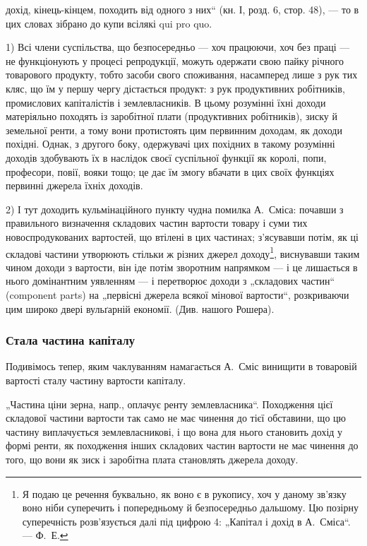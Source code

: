 \parcont{}  %
дохід, кінець-кінцем, походить від одного з них“ (кн. І, розд. 6,
стор. 48), — то в цих словах зібрано до купи всілякі qui pro quo.

1) Всі члени суспільства, що безпосередньо — хоч працюючи, хоч
без праці — не функціонують у процесі репродукції, можуть одержати
свою пайку річного товарового продукту, тобто засоби свого споживання,
насамперед лише з рук тих кляс, що їм у першу чергу дістається
продукт: з рук продуктивних робітників, промислових капіталістів і
землевласників. В цьому розумінні їхні доходи матеріяльно походять із
заробітної плати (продуктивних робітників), зиску й земельної ренти, а
тому вони протистоять цим первинним доходам, як доходи похідні.
Однак, з другого боку, одержувачі цих похідних в такому розумінні доходів
здобувають їх в наслідок своєї суспільної функції як королі,
попи, професори, повії, вояки тощо; це дає їм змогу вбачати в цих
своїх функціях первинні джерела їхніх доходів.

2) І тут доходить кульмінаційного пункту чудна помилка А.~Сміса:
почавши з правильного визначення складових частин вартости товару і
суми тих новоспродукованих вартостей, що втілені в цих частинах; з’ясувавши
потім, як ці складові частини утворюють стільки ж різних
джерел доходу\footnote{
Я подаю це речення буквально, як воно є в рукопису, хоч у даному зв’язку
воно ніби суперечить і попередньому й безпосередньо дальшому. Цю позірну
суперечність розв’язується далі під цифрою 4: „Капітал і дохід в А.~Сміса“. — Ф.~Е.
}, виснувавши таким чином доходи з вартости, він іде
потім зворотним напрямком — і це лишається в нього домінантним уявленням
— і перетворює доходи з „складових частин“ (component parts)
на „первісні джерела всякої мінової вартости“, розкриваючи цим
широко двері вульґарній економії. (Див. нашого Рошера).

\subsubsection{Стала частина капіталу}

Подивімось тепер, яким чаклуванням намагається А.~Сміс винищити
в товаровій вартості сталу частину вартости капіталу.

„Частина ціни зерна, напр., оплачує ренту землевласника“. Походження
цієї складової частини вартости так само не має чинення до тієї
обставини, що цю частину виплачується землевласникові, і що вона для
нього становить дохід у формі ренти, як походження інших складових
частин вартости не має чинення до того, що вони як зиск і заробітна
плата становлять джерела доходу.

